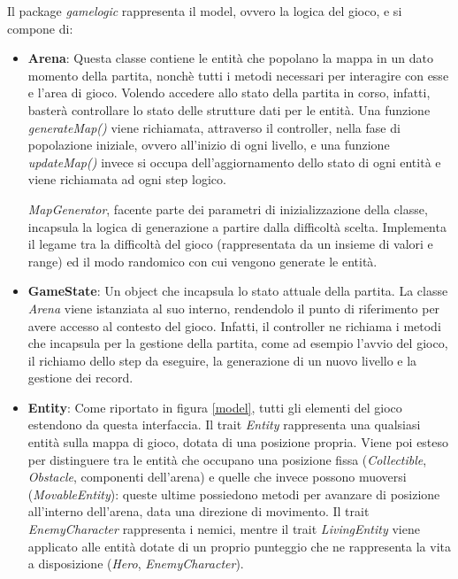 Il package \textit{gamelogic} rappresenta il model, ovvero la logica del gioco, e si compone di:

\begin{itemize}
    \item \textbf{Arena}: Questa classe contiene le entità che popolano la mappa in un dato momento della partita, nonchè tutti i metodi necessari per interagire con esse e l'area di gioco. Volendo accedere allo stato della partita in corso, infatti, basterà controllare lo stato delle strutture dati per le entità. Una funzione \textit{generateMap()} viene richiamata, attraverso il controller, nella fase di popolazione iniziale, ovvero all'inizio di ogni livello, e una funzione \textit{updateMap()} invece si occupa dell'aggiornamento dello stato di ogni entità e viene richiamata ad ogni step logico.
    
    \textit{MapGenerator}, facente parte dei parametri di inizializzazione della classe, incapsula la logica di generazione a partire dalla difficoltà scelta. Implementa il legame tra la difficoltà del gioco (rappresentata da un insieme di valori e range) ed il modo randomico con cui vengono generate le entità.

    \item \textbf{GameState}: Un object che incapsula lo stato attuale della partita. La classe \textit{Arena} viene istanziata al suo interno, rendendolo il punto di riferimento per avere accesso al contesto del gioco. Infatti, il controller ne richiama i metodi che incapsula per la gestione della partita, come ad esempio l'avvio del gioco, il richiamo dello step da eseguire, la generazione di un nuovo livello e la gestione dei record.
    
    \item \textbf{Entity}: Come riportato in figura \ref{model}, tutti gli elementi del gioco estendono da questa interfaccia. Il trait \textit{Entity} rappresenta una qualsiasi entità sulla mappa di gioco, dotata di una posizione propria. Viene poi esteso per distinguere tra le entità che occupano una posizione fissa (\textit{Collectible}, \textit{Obstacle}, componenti dell'arena) e quelle che invece possono muoversi (\textit{MovableEntity}): queste ultime possiedono metodi per avanzare di posizione all'interno dell'arena, data una direzione di movimento. Il trait \textit{EnemyCharacter} rappresenta i nemici, mentre il trait \textit{LivingEntity} viene applicato alle entità dotate di un proprio punteggio che ne rappresenta la vita a disposizione (\textit{Hero}, \textit{EnemyCharacter}).
\end{itemize}

